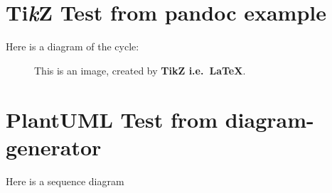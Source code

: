 \documentclass[
]{article}
\author{}
\date{}
\begin{document}
\hypertarget{tikz-test-from-pandoc-example}{%
\section{\texorpdfstring{Ti\emph{k}Z Test from pandoc
example}{TikZ Test from pandoc example}}\label{tikz-test-from-pandoc-example}}

Here is a diagram of the cycle:

\begin{figure}\centering{}\caption{This is an image, created by \textbf{TikZ i.e.~LaTeX}.}\end{figure}

\hypertarget{plantuml-test-from-diagram-generator}{%
\section{PlantUML Test from
diagram-generator}\label{plantuml-test-from-diagram-generator}}

Here is a sequence diagram
\end{document}
